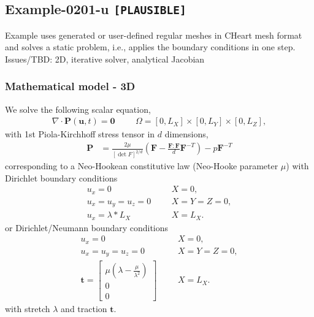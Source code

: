 %
\clearpage
%
\subsection{Example-0201-u \texttt{[PLAUSIBLE]}}
%
Example uses generated or user-defined regular meshes in CHeart mesh format
and solves a static problem, i.e., applies the boundary conditions in one step.\\[3ex]

Issues/TBD: 2D, iterative solver, analytical Jacobian
%
%
\subsubsection{Mathematical model - 3D}
%
We solve the following scalar equation,
%
\begin{align}
    \nabla \cdot \boldsymbol{P} (\boldsymbol{u}, t) = \boldsymbol{0} & &&\Omega = [0, L_X] \times [0, L_Y] \times [0, L_Z],
\end{align}
%
with 1st Piola-Kirchhoff stress tensor in $d$ dimensions,
%
\begin{align}
    \boldsymbol{P} &= \frac{2 \mu}{[\det F]^{2/d}} \left( \boldsymbol{F} - \frac{\boldsymbol{F} : \boldsymbol{F}}{d} \boldsymbol{F}^{-T} \right) - p \boldsymbol{F}^{-T}
\end{align}
%
corresponding to a Neo-Hookean constitutive law (Neo-Hooke parameter $\mu$)
with Dirichlet boundary conditions
%
\begin{align}
    u_x = 0 & &&X = 0, \\
    u_x = u_y = u_z = 0 & && X = Y = Z = 0, \\
		u_x = \lambda * L_X & &&X = L_X.
\end{align}
%
or Dirichlet/Neumann boundary conditions
%
\begin{align}
    u_x = 0 & &&X = 0, \\
    u_x = u_y = u_z = 0 & && X = Y = Z = 0, \\
		\boldsymbol{t} = \begin{bmatrix}
		  \mu (\lambda - \frac{\mu}{\lambda^2}) \\
		  0 \\
		  0
		\end{bmatrix} & &&X = L_X.
\end{align}
%
with stretch $\lambda$ and traction $\boldsymbol{t}$.
%
%
